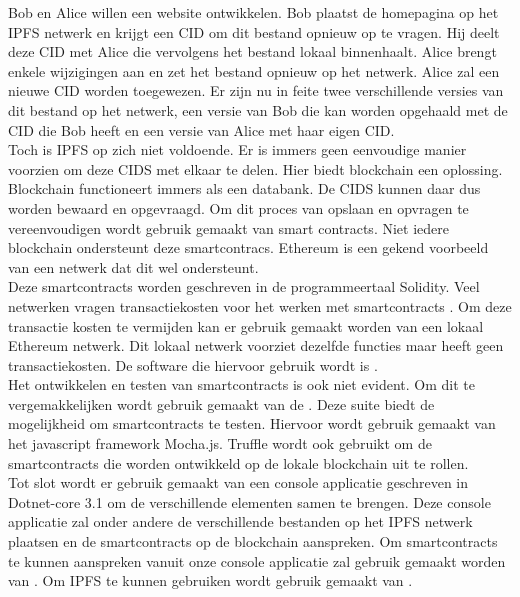 Bob en Alice willen een website ontwikkelen. Bob plaatst de homepagina op het IPFS netwerk en krijgt een CID om dit bestand opnieuw op te vragen. Hij deelt deze CID met Alice die vervolgens het bestand lokaal binnenhaalt. Alice brengt enkele wijzigingen aan en zet het bestand opnieuw op het netwerk. Alice zal een nieuwe CID worden toegewezen. Er zijn nu in feite twee verschillende versies van dit bestand op het netwerk, een versie van Bob die kan worden opgehaald met de CID die Bob heeft en een versie van Alice met haar eigen CID.\\

Toch is IPFS op zich niet voldoende. Er is immers geen eenvoudige manier voorzien om deze CIDS met elkaar te delen. Hier biedt blockchain een oplossing. Blockchain functioneert immers als een databank. De CIDS kunnen daar dus worden bewaard en opgevraagd. Om dit proces van opslaan en opvragen te vereenvoudigen wordt gebruik gemaakt van smart contracts. Niet iedere blockchain ondersteunt deze smartcontracs. Ethereum is een gekend voorbeeld van een netwerk dat dit wel ondersteunt.\\

Deze smartcontracts worden geschreven in de programmeertaal Solidity. Veel netwerken vragen transactiekosten voor het werken met smartcontracts . Om deze transactie kosten te vermijden kan er gebruik gemaakt worden van een lokaal Ethereum netwerk. Dit lokaal netwerk voorziet dezelfde functies maar heeft geen transactiekosten. De software die hiervoor gebruik wordt is \textcite{Ganache}.\\

Het ontwikkelen en testen van smartcontracts is ook niet evident. Om dit te vergemakkelijken wordt gebruik gemaakt van de \textcite{Truffle}. Deze suite biedt de mogelijkheid om smartcontracts te testen. Hiervoor wordt gebruik gemaakt van het javascript framework Mocha.js. Truffle wordt ook gebruikt om de smartcontracts die worden ontwikkeld op de lokale blockchain uit te rollen.\\

Tot slot wordt er gebruik gemaakt van een console applicatie geschreven in Dotnet-core 3.1 om de verschillende elementen samen te brengen. Deze console applicatie zal onder andere de verschillende bestanden op het IPFS netwerk plaatsen en de smartcontracts op de blockchain aanspreken. Om smartcontracts te kunnen aanspreken vanuit onze console applicatie zal gebruik gemaakt worden van \textcite{Nethereum}. Om IPFS te kunnen gebruiken wordt gebruik gemaakt van \textcite{IPFSClient}.\\


